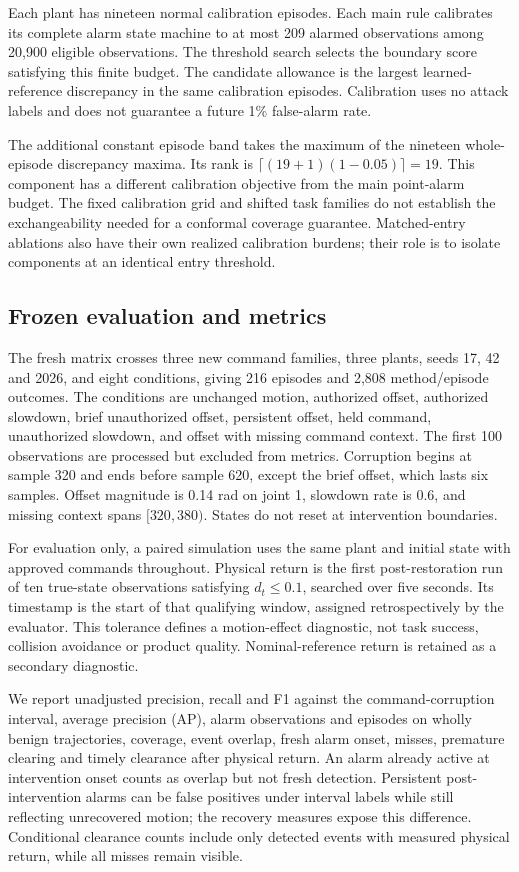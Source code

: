 \documentclass[11pt]{article}
\begin{document}
Each plant has nineteen normal calibration episodes. Each main rule calibrates its complete alarm state machine to at most 209 alarmed observations among 20,900 eligible observations. The threshold search selects the boundary score satisfying this finite budget. The candidate allowance is the largest learned-reference discrepancy in the same calibration episodes. Calibration uses no attack labels and does not guarantee a future 1\% false-alarm rate.

The additional constant episode band takes the maximum of the nineteen whole-episode discrepancy maxima. Its rank is $\lceil(19+1)(1-0.05)\rceil=19$. This component has a different calibration objective from the main point-alarm budget. The fixed calibration grid and shifted task families do not establish the exchangeability needed for a conformal coverage guarantee. Matched-entry ablations also have their own realized calibration burdens; their role is to isolate components at an identical entry threshold.

\subsection{Frozen evaluation and metrics}
The fresh matrix crosses three new command families, three plants, seeds 17, 42 and 2026, and eight conditions, giving 216 episodes and 2,808 method/episode outcomes. The conditions are unchanged motion, authorized offset, authorized slowdown, brief unauthorized offset, persistent offset, held command, unauthorized slowdown, and offset with missing command context. The first 100 observations are processed but excluded from metrics. Corruption begins at sample 320 and ends before sample 620, except the brief offset, which lasts six samples. Offset magnitude is 0.14 rad on joint 1, slowdown rate is 0.6, and missing context spans $[320,380)$. States do not reset at intervention boundaries.

For evaluation only, a paired simulation uses the same plant and initial state with approved commands throughout. Physical return is the first post-restoration run of ten true-state observations satisfying $d_t\le0.1$, searched over five seconds. Its timestamp is the start of that qualifying window, assigned retrospectively by the evaluator. This tolerance defines a motion-effect diagnostic, not task success, collision avoidance or product quality. Nominal-reference return is retained as a secondary diagnostic.

We report unadjusted precision, recall and F1 against the command-corruption interval, average precision (AP), alarm observations and episodes on wholly benign trajectories, coverage, event overlap, fresh alarm onset, misses, premature clearing and timely clearance after physical return. An alarm already active at intervention onset counts as overlap but not fresh detection. Persistent post-intervention alarms can be false positives under interval labels while still reflecting unrecovered motion; the recovery measures expose this difference. Conditional clearance counts include only detected events with measured physical return, while all misses remain visible.
\end{document}
